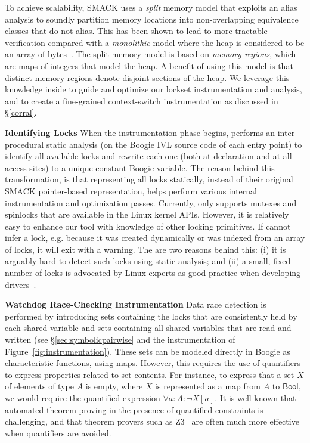 To achieve scalability, SMACK uses a \emph{split} memory model that exploits an alias analysis to soundly partition memory locations into non-overlapping equivalence classes that do not alias. This has been shown to lead to more tractable verification compared with a \emph{monolithic} model where the heap is considered to be an array of bytes~\cite{rakamaric2009scalable}. The split memory model is based on \emph{memory regions}, which are maps of integers that model the heap. A benefit of using this model is that distinct memory regions denote disjoint sections of the heap. We leverage this knowledge inside \whoop to guide and optimize our lockset instrumentation and analysis, and to create a fine-grained context-switch instrumentation as discussed in \S\ref{corral}.

\noindent\textbf{Identifying Locks }
%
When the instrumentation phase begins, \whoop performs an inter-procedural static analysis (on the Boogie IVL source code of each entry point) to identify all available locks and rewrite each one (both at declaration and at all access sites) to a unique constant Boogie variable. The reason behind this transformation, is that representing all locks statically, instead of their original SMACK pointer-based representation, helps \whoop perform various internal instrumentation and optimization passes.
%
Currently, \whoop only supports mutexes and spinlocks that are available in the Linux kernel APIs. However, it is relatively easy to enhance our tool with knowledge of other locking primitives. If \whoop cannot infer a lock, e.g. because it was created dynamically or was indexed from an array of locks, it will exit with a warning. The are two reasons behind this: (i) it is arguably hard to detect such locks using static analysis; and (ii) a small, fixed number of locks is advocated by Linux experts as good practice when developing drivers~\cite{corbet2005linux}.

\noindent\textbf{Watchdog Race-Checking Instrumentation }
%
Data race detection is performed by introducing sets containing the locks that are consistently held by each shared variable and sets containing all shared variables that are read and written (see \S\ref{sec:symbolicpairwise} and the instrumentation of Figure~\ref{fig:instrumentation}). These sets can be modeled directly in Boogie as characteristic functions, using maps. However, this requires the use of quantifiers to express properties related to set contents.  For instance, to express that a set $X$ of elements of type $A$ is empty, where $X$ is represented as a map from $A$ to $\mathsf{Bool}$, we would require the quantified expression $\forall a : A : \neg X[a]$.  It is well known that automated theorem proving in the presence of quantified constraints is challenging, and that theorem provers such as Z3~\cite{de2008z3} are often much more effective when quantifiers are avoided.  

